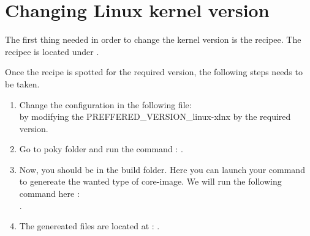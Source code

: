 \chapter{Changing Linux kernel version}
\label{chap:kernel_version}
The first thing needed in order to change the kernel version is the recipee. The recipee is located under .

Once the recipe is spotted for the required version, the following steps needs to be taken.
\begin{enumerate}
\item Change the configuration in the following file:\\  \vspace{8pt} by modifying the PREFFERED\_VERSION\_linux-xlnx by the required version.
\item Go to poky folder and run the command : .
\item Now, you should be in the build folder. Here you can launch your command to genereate the wanted type of core-image. We will run the following command here : \\ .
\item The genereated files are located at : .
\end{enumerate}
